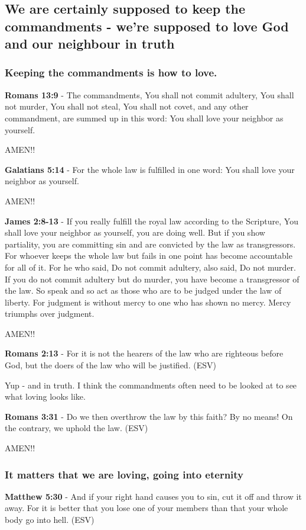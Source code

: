 \documentclass[11pt]{article}
\begin{document}
\subsection{We are certainly supposed to keep the commandments - we're supposed to love God and our neighbour in truth}
\label{sec:orgb85fdcd}
\subsubsection{Keeping the commandments is how to love.}
\label{sec:orgf5f2250}

\textbf{Romans 13:9} - The commandments, You shall not commit adultery, You shall not murder, You shall not steal, You shall not covet, and any other commandment, are summed up in this word: You shall love your neighbor as yourself.

AMEN!!

\textbf{Galatians 5:14} - For the whole law is fulfilled in one word: You shall love your neighbor as yourself.

AMEN!!

\textbf{James 2:8-13} - If you really fulfill the royal law according to the Scripture, You shall love your neighbor as yourself, you are doing well. But if you show partiality, you are committing sin and are convicted by the law as transgressors. For whoever keeps the whole law but fails in one point has become accountable for all of it. For he who said, Do not commit adultery, also said, Do not murder. If you do not commit adultery but do murder, you have become a transgressor of the law. So speak and so act as those who are to be judged under the law of liberty. For judgment is without mercy to one who has shown no mercy. Mercy triumphs over judgment.

AMEN!!

\textbf{Romans 2:13} - For it is not the hearers of the law who are righteous before God, but the doers of the law who will be justified. (ESV)

Yup - and in truth. I think the commandments often need to be looked at to see what loving looks like.

\textbf{Romans 3:31} - Do we then overthrow the law by this faith? By no means! On the contrary, we uphold the law. (ESV)

AMEN!!

\subsubsection{It matters that we are loving, going into eternity}
\label{sec:orga26bc12}
\textbf{Matthew 5:30} - And if your right hand causes you to sin, cut it off and throw it away. For it is better that you lose one of your members than that your whole body go into hell. (ESV)
\end{document}
